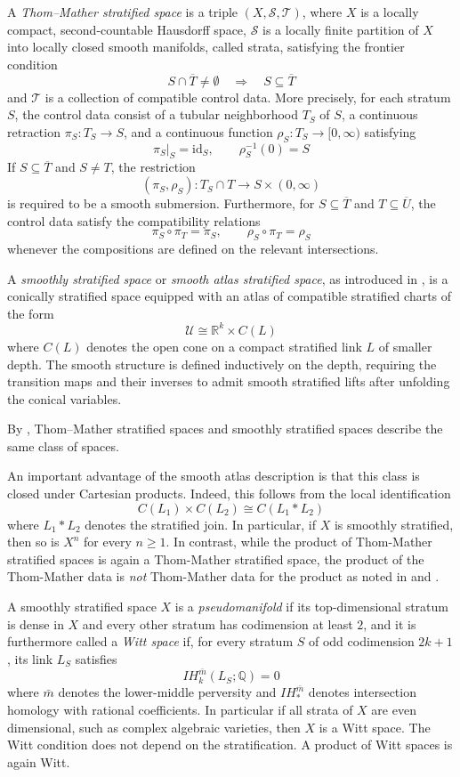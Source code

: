 \documentclass[11pt,leqno,twoside]{amsart}
\theoremstyle{plainsl}
\theoremstyle{definition}
\begin{document}
A \emph{Thom--Mather stratified space} is a triple
$(X,\mathcal S,\mathcal T)$, where $X$ is a locally compact,
second-countable Hausdorff space, $\mathcal S$ is a locally
finite partition of $X$ into locally closed smooth manifolds,
called strata, satisfying the frontier condition
\[
S\cap\overline{T}\neq\emptyset
\quad\Longrightarrow\quad S\subseteq\overline{T}
\]
and $\mathcal T$ is a collection of compatible control data.
More precisely, for each stratum $S$, the control data consist
of a tubular neighborhood $T_S$ of $S$, a continuous retraction
$\pi_S:T_S\to S$, and a continuous function
$\rho_S:T_S\to[0,\infty)$ satisfying
\[
\pi_S|_S=\mathrm{id}_S,\qquad \rho_S^{-1}(0)=S
\]
If $S\subseteq\overline{T}$ and $S\neq T$, the restriction
\[
(\pi_S,\rho_S):T_S\cap T\longrightarrow
S\times(0,\infty)
\]
is required to be a smooth submersion. Furthermore, for
$S\subseteq\overline{T}$ and $T\subseteq\overline{U}$,
the control data satisfy the compatibility relations
\[
\pi_S\circ\pi_T=\pi_S,\qquad
\rho_S\circ\pi_T=\rho_S
\]
whenever the compositions are defined on the relevant
intersections.

A \emph{ smoothly stratified space} or \emph{smooth atlas stratified space}, as introduced in
\cite[Definition 2.2]{ABP1}, is a conically stratified space
equipped with an atlas of compatible stratified charts of
the form
\[
\mathcal U\cong\mathbb R^k\times C(L)
\]
where $C(L)$ denotes the open cone on a compact stratified
link $L$ of smaller depth. The smooth structure is defined
inductively on the depth, requiring the transition maps
and their inverses to admit smooth stratified lifts after
unfolding the conical variables.

By \cite[Theorem 2.13]{ABP1}, Thom--Mather stratified spaces
and smoothly
stratified spaces  describe the same class
of spaces.

An important advantage of the smooth
atlas description is that this class is closed under
Cartesian products. Indeed, this follows from the local
identification
\[
C(L_1)\times C(L_2)\cong C(L_1*L_2)
\]
where $L_1*L_2$ denotes the stratified join. In particular, if $X$ is smoothly stratified, then so is $X^n$ for every
$n\geq 1$. In contrast, while the  product of Thom-Mather stratified spaces is
again a Thom-Mather stratified space, the product of the Thom-Mather data is \emph{not} Thom-Mather data for the
product as noted in \cite{Ve} and \cite[Remark 2.12]{ABP1}.



A smoothly stratified space $X$ is a \textit{pseudomanifold} if its top-dimensional stratum is dense in $X$ and every other stratum has codimension at least $2$, and  it is furthermore called a
\emph{Witt space} if, for every stratum $S$ of odd
codimension $2k+1$, its link $L_S$ satisfies
\[
IH_k^{\bar m}(L_S;\mathbb Q)=0
\]
where $\bar m$ denotes the lower-middle perversity
and $IH_*^{\bar m}$ denotes intersection homology
with rational coefficients. In particular if all strata of $X$ are even dimensional, such as complex algebraic varieties, then $X$ is a Witt space. The Witt condition does not depend on the stratification. A product of Witt spaces is again Witt.
\end{document}
